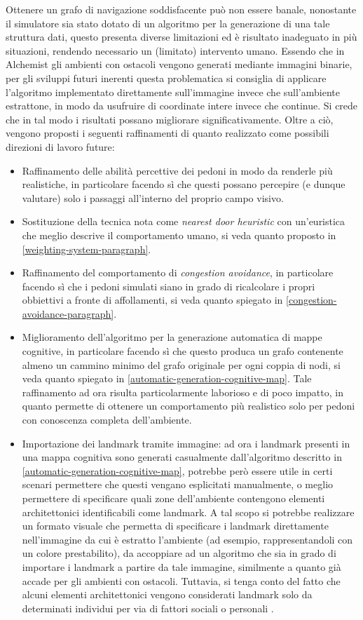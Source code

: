 \documentclass[12pt,a4paper,openright,oneside]{book}
\begin{document}
Ottenere un grafo di navigazione soddisfacente può non essere banale, nonostante il simulatore sia stato dotato di un algoritmo per la generazione di una tale struttura dati, questo presenta diverse limitazioni ed è risultato inadeguato in più situazioni, rendendo necessario un (limitato) intervento umano. Essendo che in Alchemist gli ambienti con ostacoli vengono generati mediante immagini binarie, per gli sviluppi futuri inerenti questa problematica si consiglia di applicare l'algoritmo implementato direttamente sull'immagine invece che sull'ambiente estrattone, in modo da usufruire di coordinate intere invece che continue. Si crede che in tal modo i risultati possano migliorare significativamente. Oltre a ciò, vengono proposti i seguenti raffinamenti di quanto realizzato come possibili direzioni di lavoro future:
\begin{itemize}
    \item Raffinamento delle abilità percettive dei pedoni in modo da renderle più realistiche, in particolare facendo sì che questi possano percepire (e dunque valutare) solo i passaggi all'interno del proprio campo visivo.
    \item Sostituzione della tecnica nota come \emph{nearest door heuristic} con un'euristica che meglio descrive il comportamento umano, si veda quanto proposto in \ref{weighting-system-paragraph}.
    \item Raffinamento del comportamento di \emph{congestion avoidance}, in particolare facendo sì che i pedoni simulati siano in grado di ricalcolare i propri obbiettivi a fronte di affollamenti, si veda quanto spiegato in \ref{congestion-avoidance-paragraph}.
    \item Miglioramento dell'algoritmo per la generazione automatica di mappe cognitive, in particolare facendo sì che questo produca un grafo contenente almeno un cammino minimo del grafo originale per ogni coppia di nodi, si veda quanto spiegato in \ref{automatic-generation-cognitive-map}. Tale raffinamento ad ora risulta particolarmente laborioso e di poco impatto, in quanto permette di ottenere un comportamento più realistico solo per pedoni con conoscenza completa dell'ambiente.
    \item Importazione dei landmark tramite immagine: ad ora i landmark presenti in una mappa cognitiva sono generati casualmente dall'algoritmo descritto in \ref{automatic-generation-cognitive-map}, potrebbe però essere utile in certi scenari permettere che questi vengano esplicitati manualmente, o meglio permettere di specificare quali zone dell'ambiente contengono elementi architettonici identificabili come landmark. A tal scopo si potrebbe realizzare un formato visuale che permetta di specificare i landmark direttamente nell'immagine da cui è estratto l'ambiente (ad esempio, rappresentandoli con un colore prestabilito), da accoppiare ad un algoritmo che sia in grado di importare i landmark a partire da tale immagine, similmente a quanto già accade per gli ambienti con ostacoli. Tuttavia, si tenga conto del fatto che alcuni elementi architettonici vengono considerati landmark solo da determinati individui per via di fattori sociali o personali \cite{Appleyard1969}. 
\end{itemize}
\end{document}
